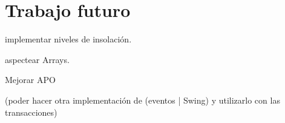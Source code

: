 
\section{Trabajo futuro}
\label{sec:futurework}

implementar niveles de insolación.

aspectear Arrays.

Mejorar APO

(poder hacer otra implementación de (eventos | Swing) y utilizarlo con las
transacciones)

